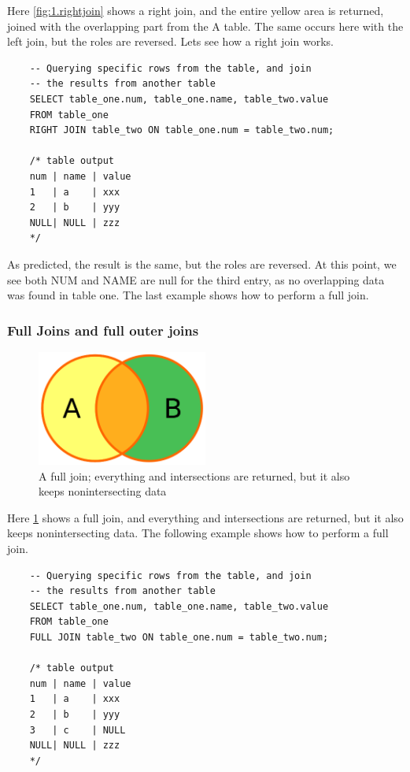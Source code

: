 Here \cref{fig:1.rightjoin} shows a right join, and the entire yellow area is returned, joined with the overlapping part from the A table. The same occurs here with the left join, but the roles are reversed. Lets see how a right join works.

\begin{verbatim}
    -- Querying specific rows from the table, and join 
    -- the results from another table
    SELECT table_one.num, table_one.name, table_two.value
    FROM table_one
    RIGHT JOIN table_two ON table_one.num = table_two.num;

    /* table output
    num | name | value
    1   | a    | xxx
    2   | b    | yyy
    NULL| NULL | zzz
    */
\end{verbatim}

As predicted, the result is the same, but the roles are reversed. At this point, we see both NUM and NAME are null for the third entry, as no overlapping data was found in table one. The last example shows how to perform a full join.

\subsubsection{Full Joins and full outer joins}

\begin{figure}[H]
    \centering
    \includegraphics[width=0.5\textwidth]{content/1-relational-databases/figures/joins/fulljoin.png}
    \caption{A full join; everything and intersections are returned, but it also keeps nonintersecting data}
    \label{fig:1.fulljoin}
\end{figure}

Here \cref{fig:1.fulljoin} shows a full join, and everything and intersections are returned, but it also keeps nonintersecting data. The following example shows how to perform a full join.

\begin{verbatim}
    -- Querying specific rows from the table, and join 
    -- the results from another table
    SELECT table_one.num, table_one.name, table_two.value
    FROM table_one
    FULL JOIN table_two ON table_one.num = table_two.num;

    /* table output
    num | name | value
    1   | a    | xxx
    2   | b    | yyy
    3   | c    | NULL
    NULL| NULL | zzz
    */
\end{verbatim}

